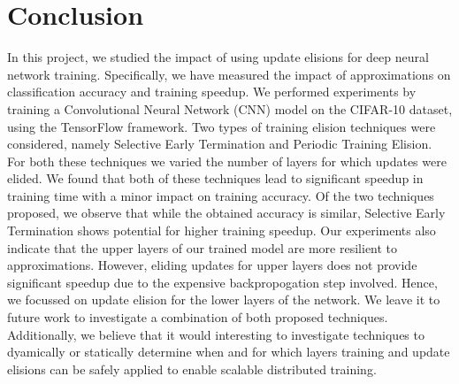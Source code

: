 \section{Conclusion}
In this project, we studied the impact of using update elisions for deep neural network training. Specifically, we have measured the impact of approximations on classification accuracy and training speedup. We performed experiments by training a Convolutional Neural Network (CNN) model on the CIFAR-10 dataset, using the TensorFlow framework. Two types of training elision techniques were considered, namely Selective Early Termination and Periodic Training Elision. For both these techniques we varied the number of layers for which updates were elided. We found that both of these techniques lead to significant speedup in training time with a minor impact on training accuracy.  Of the two techniques proposed, we observe that while the obtained accuracy is similar, Selective Early Termination shows potential for higher training speedup. Our experiments also indicate that the upper layers of our trained model are more resilient to approximations. However, eliding updates for upper layers does not provide significant speedup due to the expensive backpropogation step involved. Hence, we focussed on update elision for the lower layers of the network.
We leave it to future work to investigate a combination of both proposed techniques. Additionally, we believe that it would interesting to investigate techniques to dyamically or statically determine when and for which layers training and update elisions can be safely applied to enable scalable distributed training.  
